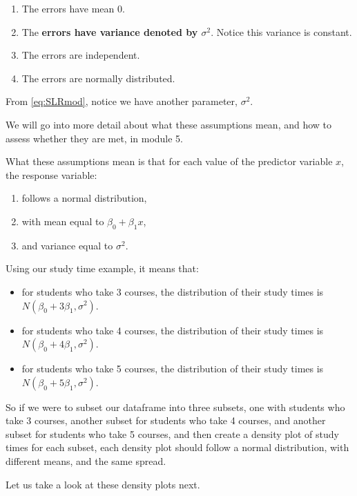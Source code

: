 \documentclass[
]{book}
\providecommand{\tightlist}{%
  \setlength{\itemsep}{0pt}\setlength{\parskip}{0pt}}
\begin{document}
\begin{enumerate}
\def\labelenumi{\arabic{enumi}.}
\tightlist
\item
  The errors have mean 0.
\item
  The \textbf{errors have variance denoted by \(\sigma^2\)}. Notice this variance is constant.
\item
  The errors are independent.
\item
  The errors are normally distributed.
\end{enumerate}

From \eqref{eq:SLRmod}, notice we have another parameter, \(\sigma^2\).

We will go into more detail about what these assumptions mean, and how to assess whether they are met, in module 5.

What these assumptions mean is that for each value of the predictor variable \(x\), the response variable:

\begin{enumerate}
\def\labelenumi{\arabic{enumi}.}
\tightlist
\item
  follows a normal distribution,
\item
  with mean equal to \(\beta_0+\beta_{1} x\),
\item
  and variance equal to \(\sigma^2\).
\end{enumerate}

Using our study time example, it means that:

\begin{itemize}
\tightlist
\item
  for students who take 3 courses, the distribution of their study times is \(N(\beta_0 + 3\beta_1, \sigma^2)\).
\item
  for students who take 4 courses, the distribution of their study times is \(N(\beta_0 + 4\beta_1, \sigma^2)\).
\item
  for students who take 5 courses, the distribution of their study times is \(N(\beta_0 + 5\beta_1, \sigma^2)\).
\end{itemize}

So if we were to subset our dataframe into three subsets, one with students who take 3 courses, another subset for students who take 4 courses, and another subset for students who take 5 courses, and then create a density plot of study times for each subset, each density plot should follow a normal distribution, with different means, and the same spread.

Let us take a look at these density plots next.
\end{document}
